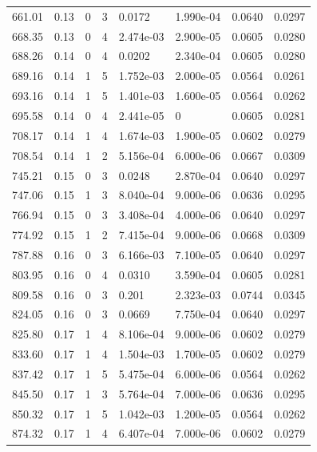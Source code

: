 \documentclass[preview]{standalone}
\begin{document}
{{{\begin{tabular}{L{1.2cm}C{1.2cm} C{0.3cm}C{0.5cm} C{1.4cm}C{1.4cm} C{1.4cm}C{1.4cm}}
  661.01  &  0.13  & 0     &  3 &  0.0172  & 1.990e-04  & 0.0640 &  0.0297   \\ 
  668.35  &  0.13  & 0     &  4 &  2.474e-03  & 2.900e-05  & 0.0605 &  0.0280   \\ 
  688.26  &  0.14  & 0     &  4 &  0.0202  & 2.340e-04  & 0.0605 &  0.0280   \\ 
  689.16  &  0.14  & 1     &  5 &  1.752e-03  & 2.000e-05  & 0.0564 &  0.0261   \\ 
  693.16  &  0.14  & 1     &  5 &  1.401e-03  & 1.600e-05  & 0.0564 &  0.0262   \\ 
  695.58  &  0.14  & 0     &  4 &  2.441e-05  & 0  & 0.0605 &  0.0281   \\ 
  708.17  &  0.14  & 1     &  4 &  1.674e-03  & 1.900e-05  & 0.0602 &  0.0279   \\ 
  708.54  &  0.14  & 1     &  2 &  5.156e-04  & 6.000e-06  & 0.0667 &  0.0309   \\ 
  745.21  &  0.15  & 0     &  3 &  0.0248  & 2.870e-04  & 0.0640 &  0.0297   \\ 
  747.06  &  0.15  & 1     &  3 &  8.040e-04  & 9.000e-06  & 0.0636 &  0.0295   \\ 
  766.94  &  0.15  & 0     &  3 &  3.408e-04  & 4.000e-06  & 0.0640 &  0.0297   \\ 
  774.92  &  0.15  & 1     &  2 &  7.415e-04  & 9.000e-06  & 0.0668 &  0.0309   \\ 
  787.88  &  0.16  & 0     &  3 &  6.166e-03  & 7.100e-05  & 0.0640 &  0.0297   \\ 
  803.95  &  0.16  & 0     &  4 &  0.0310  & 3.590e-04  & 0.0605 &  0.0281   \\ 
  809.58  &  0.16  & 0     &  3 &  0.201  & 2.323e-03  & 0.0744 &  0.0345   \\ 
  824.05  &  0.16  & 0     &  3 &  0.0669  & 7.750e-04  & 0.0640 &  0.0297   \\ 
  825.80  &  0.17  & 1     &  4 &  8.106e-04  & 9.000e-06  & 0.0602 &  0.0279   \\ 
  833.60  &  0.17  & 1     &  4 &  1.504e-03  & 1.700e-05  & 0.0602 &  0.0279   \\ 
  837.42  &  0.17  & 1     &  5 &  5.475e-04  & 6.000e-06  & 0.0564 &  0.0262   \\ 
  845.50  &  0.17  & 1     &  3 &  5.764e-04  & 7.000e-06  & 0.0636 &  0.0295   \\ 
  850.32  &  0.17  & 1     &  5 &  1.042e-03  & 1.200e-05  & 0.0564 &  0.0262   \\ 
  874.32  &  0.17  & 1     &  4 &  6.407e-04  & 7.000e-06  & 0.0602 &  0.0279   \\ 

\end{tabular}}}}
\end{document}
